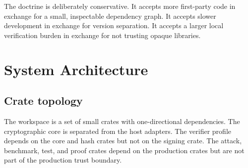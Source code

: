 \documentclass[11pt,a4paper]{article}
\begin{document}
The doctrine is deliberately conservative. It accepts more first-party code in
exchange for a small, inspectable dependency graph. It accepts slower
development in exchange for version separation. It accepts a larger local
verification burden in exchange for not trusting opaque libraries.

\section{System Architecture}

\subsection{Crate topology}

The workspace is a set of small crates with one-directional dependencies. The
cryptographic core is separated from the host adapters. The verifier profile
depends on the core and hash crates but not on the signing crate. The attack,
benchmark, test, and proof crates depend on the production crates but are not
part of the production trust boundary.
\end{document}
